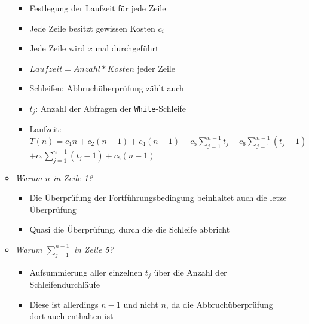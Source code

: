 \documentclass[
    ngerman,
    color=3b,
    load_common, %
    summary,
    boxarc,
]{tuda_summary}
\begin{document}
\begin{itemize}
\begin{itemize}
                    \begin{minipage}[t]{0.45\textwidth}
                        \vspace*{-2.3cm}
                        \begin{itemize}
                            \item Festlegung der Laufzeit für jede Zeile
                            \item Jede Zeile besitzt gewissen Kosten \texttt{$c_i$}
                            \item Jede Zeile wird $x$ mal durchgeführt
                            \item $Laufzeit = Anzahl * Kosten$ jeder Zeile
                            \item Schleifen: Abbruchüberprüfung zählt auch
                            \item \texttt{$t_j$}: Anzahl der Abfragen der \texttt{While}-Schleife
                            \item Laufzeit:
                                  $T(n)=c_{1} n+c_{2}(n-1)+c_{4}(n-1)+c_{5} \sum_{j=1}^{n-1} t_{j}+c_{6} \sum_{j=1}^{n-1}\left(t_{j}-1\right)$\\$+c_{7} \sum_{j=1}^{n-1}\left(t_{j}-1\right)+c_{8}(n-1)$
                        \end{itemize}
                    \end{minipage}
                    \vspace*{-1.1em}
              \item \textit{Warum $n$ in Zeile 1?}
                    \begin{itemize}
                        \item Die Überprüfung der Fortführungsbedingung beinhaltet auch die letze Überprüfung
                        \item Quasi die Überprüfung, durch die die Schleife abbricht
                    \end{itemize}

              \item \textit{Warum $\sum^{n-1}_{j=1}$ in Zeile 5?}
                    \begin{itemize}
                        \item Aufsummierung aller einzelnen $t_j$ über die Anzahl der Schleifendurchläufe
                        \item Diese ist allerdings $n-1$ und nicht $n$, da die Abbruchüberprüfung dort auch enthalten ist
                    \end{itemize}


\end{itemize}
\end{itemize}
\end{document}

